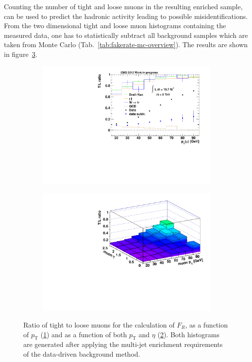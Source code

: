 Counting the number of tight and loose muons in the resulting enriched sample, can be used to predict the hadronic activity leading to possible misidentifications. From the two dimensional tight and loose muon histograms containing the measured data, one has to statistically subtract all background samples which are taken from Monte Carlo (Tab.~\ref{tab:fakerate-mc-overview}). The results are shown in figure~\ref{fig:tlratios}.
 
\begin{figure}[!htb]
  \centering
  \begin{subfigure}[b]{0.495\textwidth}
    \centering
    \includegraphics[width=\textwidth]{plots/tlratio.pdf}
    \caption{\label{fig:tlratio}}
  \end{subfigure}
  \begin{subfigure}[b]{0.495\textwidth}
    \centering
    \includegraphics[width=\textwidth]{plots/tlratio2d.pdf}
    \caption{\label{fig:tlratio2d}}
  \end{subfigure}

  \caption{Ratio of tight to loose muons for the calculation of $F_R$, as a function of $p_{\text{T}}$ (\ref{fig:tlratio}) and as a function of both $p_{\text{T}}$ and $\eta$ (\ref{fig:tlratio2d}). Both histograms are generated after applying the multi-jet enrichment requirements of the data-driven background method.}
  \label{fig:tlratios}
\end{figure}

